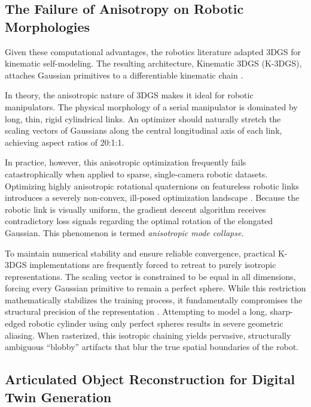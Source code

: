 \documentclass[12pt,a4paper,oneside]{report}
\begin{document}
\subsection{The Failure of Anisotropy on Robotic Morphologies}
\label{subsec:the_failure_of_anisotropy_on_robotic_morphologies}

Given these computational advantages, the robotics literature adapted 3DGS for kinematic self-modeling. The resulting architecture, Kinematic 3DGS (K-3DGS), attaches Gaussian primitives to a differentiable kinematic chain \cite{hu2025learning}.

In theory, the anisotropic nature of 3DGS makes it ideal for robotic manipulators. The physical morphology of a serial manipulator is dominated by long, thin, rigid cylindrical links. An optimizer should naturally stretch the scaling vectors of Gaussians along the central longitudinal axis of each link, achieving aspect ratios of 20:1:1.

In practice, however, this anisotropic optimization frequently fails catastrophically when applied to sparse, single-camera robotic datasets. Optimizing highly anisotropic rotational quaternions on featureless robotic links introduces a severely non-convex, ill-posed optimization landscape \cite{hu2025learning}. Because the robotic link is visually uniform, the gradient descent algorithm receives contradictory loss signals regarding the optimal rotation of the elongated Gaussian. This phenomenon is termed \textit{anisotropic mode collapse}.

To maintain numerical stability and ensure reliable convergence, practical K-3DGS implementations are frequently forced to retreat to purely isotropic representations. The scaling vector is constrained to be equal in all dimensions, forcing every Gaussian primitive to remain a perfect sphere. While this restriction mathematically stabilizes the training process, it fundamentally compromises the structural precision of the representation \cite{hu2025learning}. Attempting to model a long, sharp-edged robotic cylinder using only perfect spheres results in severe geometric aliasing. When rasterized, this isotropic chaining yields pervasive, structurally ambiguous ``blobby'' artifacts that blur the true spatial boundaries of the robot.


\subsection{Articulated Object Reconstruction for Digital Twin Generation}
\label{subsec:articulated_object_reconstruction_for_digital_twin_generation}
\end{document}
